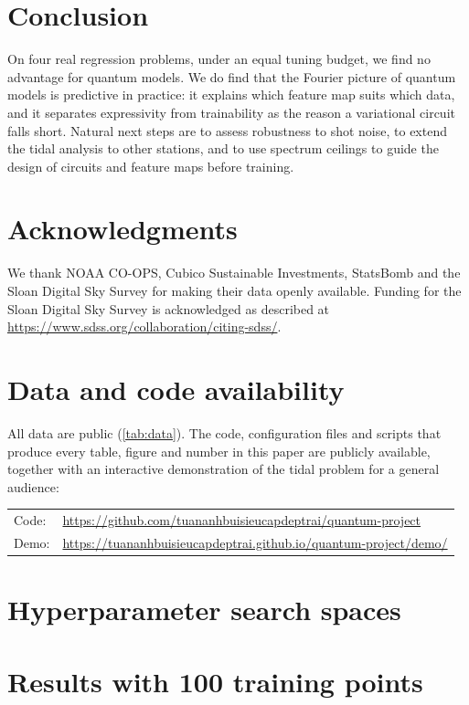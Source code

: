 \documentclass[11pt,letterpaper]{article}
\begin{document}
\section{Conclusion}

On four real regression problems, under an equal tuning budget, we find no advantage for
quantum models. We do find that the Fourier picture of quantum models is predictive in
practice: it explains which feature map suits which data, and it separates expressivity from
trainability as the reason a variational circuit falls short. Natural next steps are to
assess robustness to shot noise, to extend the tidal analysis to other stations, and to use
spectrum ceilings to guide the design of circuits and feature maps before training.

\section*{Acknowledgments}
We thank NOAA CO-OPS, Cubico Sustainable Investments, StatsBomb and the Sloan Digital Sky
Survey for making their data openly available. Funding for the Sloan Digital Sky Survey is
acknowledged as described at \url{https://www.sdss.org/collaboration/citing-sdss/}.

\section*{Data and code availability}
All data are public (\cref{tab:data}). The code, configuration files and scripts that produce
every table, figure and number in this paper are publicly available, together with an
interactive demonstration of the tidal problem for a general audience:
\begin{center}\small
\begin{tabular}{@{}ll@{}}
Code: & \url{https://github.com/tuananhbuisieucapdeptrai/quantum-project}\\
Demo: & \url{https://tuananhbuisieucapdeptrai.github.io/quantum-project/demo/}
\end{tabular}
\end{center}




\clearpage
\appendix

\section{Hyperparameter search spaces}
\label{app:spaces}

\begin{table}[H]
\centering\small
\caption{\label{tab:spaces}Hyperparameters tuned for each model, with ten trials per run.
UTide, the logistic xG model and the published references have no tuned hyperparameters.}

\end{table}

\section{Results with 100 training points}


\end{document}
